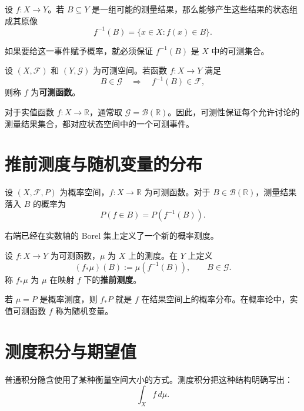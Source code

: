 \documentclass[UTF8,a4paper,11pt,openany]{ctexbook}
\begin{document}
设 $f:X\to Y$。若 $B\subseteq Y$ 是一组可能的测量结果，那么能够产生这些结果的状态组成其原像
\[
f^{-1}(B)
=
\{x\in X:f(x)\in B\}.
\]

如果要给这一事件赋予概率，就必须保证 $f^{-1}(B)$ 是 $X$ 中的可测集合。

\begin{definition}[可测函数]
设 $(X,\mathcal F)$ 和 $(Y,\mathcal G)$ 为可测空间。若函数 $f:X\to Y$ 满足
\[
B\in\mathcal G
\quad\Longrightarrow\quad
f^{-1}(B)\in\mathcal F,
\]
则称 $f$ 为\textbf{可测函数}。
\end{definition}

对于实值函数 $f:X\to\mathbb R$，通常取 $\mathcal G=\mathcal B(\mathbb R)$。因此，可测性保证每个允许讨论的测量结果集合，都对应状态空间中的一个可测事件。

\section{推前测度与随机变量的分布}

设 $(X,\mathcal F,P)$ 为概率空间，$f:X\to\mathbb R$ 为可测函数。对于 $B\in\mathcal B(\mathbb R)$，测量结果落入 $B$ 的概率为
\begin{equation}
    P(f\in B)
    =
    P\!\left(f^{-1}(B)\right).
\end{equation}

右端已经在实数轴的 Borel 集上定义了一个新的概率测度。

\begin{definition}[推前测度]
设 $f:X\to Y$ 为可测函数，$\mu$ 为 $X$ 上的测度。在 $Y$ 上定义
\begin{equation}
    (f_*\mu)(B)
    :=
    \mu\!\left(f^{-1}(B)\right),
    \qquad
    B\in\mathcal G.
\end{equation}
称 $f_*\mu$ 为 $\mu$ 在映射 $f$ 下的\textbf{推前测度}。
\end{definition}

若 $\mu=P$ 是概率测度，则 $f_*P$ 就是 $f$ 在结果空间上的概率分布。在概率论中，实值可测函数 $f$ 称为随机变量。

\section{测度积分与期望值}

普通积分隐含使用了某种衡量空间大小的方式。测度积分把这种结构明确写出：
\[
\int_X f\,d\mu.
\]
\end{document}
